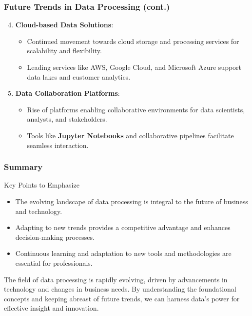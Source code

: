 \documentclass{beamer}
\begin{document}
\begin{frame}[fragile]
    \frametitle{Future Trends in Data Processing (cont.)}
    \begin{enumerate}
        \setcounter{enumi}{3}
        \item \textbf{Cloud-based Data Solutions}:
        \begin{itemize}
            \item Continued movement towards cloud storage and processing services for scalability and flexibility.
            \item Leading services like AWS, Google Cloud, and Microsoft Azure support data lakes and customer analytics.
        \end{itemize}
        
        \item \textbf{Data Collaboration Platforms}:
        \begin{itemize}
            \item Rise of platforms enabling collaborative environments for data scientists, analysts, and stakeholders.
            \item Tools like \textbf{Jupyter Notebooks} and collaborative pipelines facilitate seamless interaction.
        \end{itemize}
    \end{enumerate}
\end{frame}

\begin{frame}[fragile]
    \frametitle{Summary}
    \begin{block}{Key Points to Emphasize}
        \begin{itemize}
            \item The evolving landscape of data processing is integral to the future of business and technology.
            \item Adapting to new trends provides a competitive advantage and enhances decision-making processes.
            \item Continuous learning and adaptation to new tools and methodologies are essential for professionals.
        \end{itemize}
    \end{block}

    The field of data processing is rapidly evolving, driven by advancements in technology and changes in business needs. By understanding the foundational concepts and keeping abreast of future trends, we can harness data's power for effective insight and innovation.
\end{frame}
\end{document}
